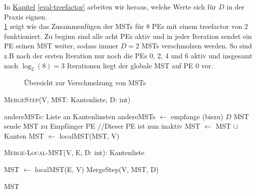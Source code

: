 In \hyperref[eval-treefactor]{Kapitel} \ref{eval-treefactor} arbeiten wir heraus, welche Werte sich für $D$ in der Praxis eignen.\\
\cref{MergeMST-Img} zeigt wie das Zusammenfügen der MSTs für 8 PEs mit einem treefactor von 2 funktioniert. 
Zu beginn sind alle acht PEs aktiv und in jeder Iteration sendet ein PE seinen MST weiter, sodass immer $D=2$ MSTs verschmolzen werden. So sind z.B nach der ersten Iteration nur noch die PEs 0, 2, 4 und 6 aktiv und insgesamt nach $\log_2(8) = 3$ Iterationen liegt der globale MST auf PE 0 vor.\\

\newpage
 

\begin{figure}[H]
    \centering
    
    \caption{Übersicht zur Verschmelzung von MSTs}
    \label{MergeMST-Img}
\end{figure}


\begin{algorithm} 
\caption{\textsc{MergeStep}(V, MST: Kantenliste, D: int)}
\begin{algorithmic}[1]
\label{MergeStep}
\STATE andereMSTs: Liste an Kantenlinsten
    \STATE andereMSTs $\gets$ empfange (biszu) $D$ MST 
\ELSE
    \STATE sende MST zu Empfänger PE
    \RETURN //Dieser PE ist nun inaktiv
\ENDIF
{}
    \STATE MST $\gets$ MST $\cup$ Kanten
\ENDFOR
\STATE MST $\leftarrow$ localMST(MST, V)
\end{algorithmic}
\end{algorithm}

\begin{algorithm} 
\caption{\textsc{Merge-Local-MST}(V, E, D: int): Kantenliste}
\begin{algorithmic}[1]
\label{Merge-Local-MST-Algo}
 
\STATE MST $\leftarrow$ localMST(E, V)
    \STATE MergeStep(V, MST, D)
\ENDFOR

\RETURN MST
\end{algorithmic}
\end{algorithm}



